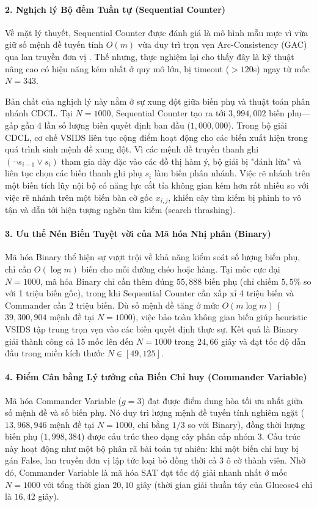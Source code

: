 \documentclass[a4paper,fleqn]{cas-sc}
\begin{document}
\paragraph{2. Nghịch lý Bộ đếm Tuần tự (Sequential Counter)}
Về mặt lý thuyết, Sequential Counter được đánh giá là mô hình mẫu mực vì vừa giữ số mệnh đề tuyến tính $O(m)$ vừa duy trì trọn vẹn Arc-Consistency (GAC) qua lan truyền đơn vị \cite{sinz2005towards}. Thế nhưng, thực nghiệm lại cho thấy đây là kỹ thuật nâng cao có hiệu năng kém nhất ở quy mô lớn, bị timeout ($> 120$s) ngay từ mốc $N = 343$.

Bản chất của nghịch lý này nằm ở sự xung đột giữa biến phụ và thuật toán phân nhánh CDCL. Tại $N = 1000$, Sequential Counter tạo ra tới $3{,}994{,}002$ biến phụ---gấp gần 4 lần số lượng biến quyết định ban đầu ($1{,}000{,}000$). Trong bộ giải CDCL, cơ chế VSIDS liên tục cộng điểm hoạt động cho các biến xuất hiện trong quá trình sinh mệnh đề xung đột. Vì các mệnh đề truyền thanh ghi $(\neg s_{i-1} \lor s_i)$ tham gia dày đặc vào các đồ thị hàm ý, bộ giải bị "đánh lừa" và liên tục chọn các biến thanh ghi phụ $s_i$ làm biến phân nhánh. Việc rẽ nhánh trên một biến tích lũy nội bộ có năng lực cắt tỉa không gian kém hơn rất nhiều so với việc rẽ nhánh trên một biến bàn cờ gốc $x_{i,j}$, khiến cây tìm kiếm bị phình to vô tận và dẫn tới hiện tượng nghẽn tìm kiếm (search thrashing).

\paragraph{3. Ưu thế Nén Biến Tuyệt vời của Mã hóa Nhị phân (Binary)}
Mã hóa Binary thể hiện sự vượt trội về khả năng kiểm soát số lượng biến phụ, chỉ cần $O(\log m)$ biến cho mỗi đường chéo hoặc hàng. Tại mốc cực đại $N = 1000$, mã hóa Binary chỉ cần thêm đúng $55{,}888$ biến phụ (chỉ chiếm $5{,}5\%$ so với 1 triệu biến gốc), trong khi Sequential Counter cần xấp xỉ 4 triệu biến và Commander cần 2 triệu biến. Dù số mệnh đề tăng ở mức $O(m \log m)$ ($39{,}300{,}904$ mệnh đề tại $N = 1000$), việc bảo toàn không gian biến giúp heuristic VSIDS tập trung trọn vẹn vào các biến quyết định thực sự. Kết quả là Binary giải thành công cả 15 mốc lên đến $N = 1000$ trong $24{,}66$ giây và đạt tốc độ dẫn đầu trong miền kích thước $N \in [49, 125]$.

\paragraph{4. Điểm Cân bằng Lý tưởng của Biến Chỉ huy (Commander Variable)}
Mã hóa Commander Variable ($g=3$) đạt được điểm dung hòa tối ưu nhất giữa số mệnh đề và số biến phụ. Nó duy trì lượng mệnh đề tuyến tính nghiêm ngặt ($13{,}968{,}946$ mệnh đề tại $N = 1000$, chỉ bằng $1/3$ so với Binary), đồng thời lượng biến phụ ($1{,}998{,}384$) được cấu trúc theo dạng cây phân cấp nhóm 3. Cấu trúc này hoạt động như một bộ phân rã bài toán tự nhiên: khi một biến chỉ huy bị gán False, lan truyền đơn vị lập tức loại bỏ đồng thời cả 3 ô cờ thành viên. Nhờ đó, Commander Variable là mã hóa SAT đạt tốc độ giải nhanh nhất ở mốc $N = 1000$ với tổng thời gian $20{,}10$ giây (thời gian giải thuần túy của Glucose4 chỉ là $16{,}42$ giây).
\end{document}
